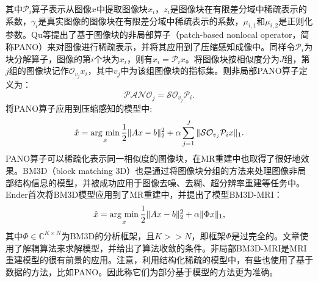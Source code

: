 其中$\mathcal{P}_i$算子表示从图像$x$中提取图像块$x_i$，$z_i$是图像块在有限差分域中稀疏表示的系数，$\gamma_i$是真实图像的图像块在有限差分域中稀疏表示的系数，$\mu_{i,1}$和$\mu_{i,2}$是正则化参数。Qu等\cite{qu2014magnetic}提出了基于图像块的非局部算子（patch-based nonlocal operator，简称PANO）来对图像进行稀疏表示，并将其应用到了压缩感知成像中。同样令$\mathcal{P}_i$为块分解算子，图像的第$i$个块为$x_i$，则有$x_i=\mathcal{P}_ix$。将图像块按相似度分为$J$组，第$j$组的图像块记作$\mathcal{O}_{v_j}x_i$，其中$v_j$中为该组图像块的指标集。则非局部PANO算子定义为：
$$\mathcal{PANO}_j=\mathcal{S}\mathcal{O}_{v_j}\mathcal{P}_i.$$
将PANO算子应用到压缩感知的模型中:
\begin{equation}
	\hat{x}=\argmin_x \frac{1}{2}\|Ax-b\|_2^2 + \alpha\sum^J_{j=1}\|\mathcal{S}\mathcal{O}_{v_j}\mathcal{P}_ix\|_1.
\end{equation}
PANO算子可以稀疏化表示同一相似度的图像块，在MR重建中也取得了很好地效果。BM3D（block matching 3D）\cite{dabov2007image}也是通过将图像块分组的方法来处理图像非局部结构信息的模型，并被成功应用于图像去噪、去糊、超分辨率重建等任务中。Ender\cite{eksioglu2016decoupled}首次将BM3D模型应用到了MR重建中，并提出了模型BM3D-MRI：
\begin{equation}
	\hat{x}=\argmin_x \frac{1}{2}\|Ax-b\|^2_2+\alpha\|\Phi x\|_1,
\end{equation}
其中$\Phi\in\mathbb{C}^{K\times N}$为BM3D的分析框架，且$K>>N$，即框架$\Phi$是过完全的。文章使用了解耦算法来求解模型，并给出了算法收敛的条件。非局部BM3D-MRI是MRI重建模型的很有前景的应用。注意，利用结构化稀疏的模型中，有些也使用了基于数据的方法，比如PANO。因此称它们为部分基于模型的方法更为准确。

